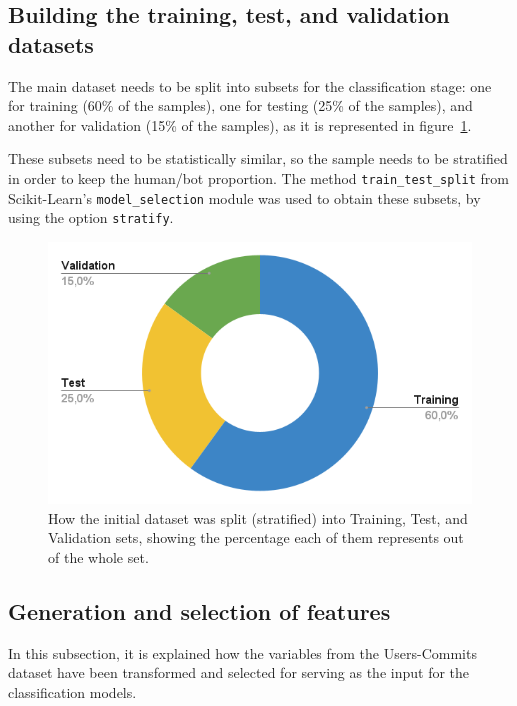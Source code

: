 \documentclass[a4paper, 12pt]{book}
\begin{document}
\subsection{Building the training, test, and validation datasets}
\label{ssec:build-training-datasets}

The main dataset needs to be split into subsets for the classification stage: one for training (60\% of the samples), one for testing (25\% of the samples), and another for validation (15\% of the samples), as it is represented in figure~\ref{fig:dataset-percentages}. 

These subsets need to be statistically similar, so the sample needs to be stratified in order to keep the human/bot proportion. The method \texttt{train\_test\_split} from Scikit-Learn's \texttt{model\_selection} module was used to obtain these subsets, by using the option \texttt{stratify}.

\begin{figure}
 \centering
  \includegraphics[width=12cm, keepaspectratio]{img/dataset-percentages.png}
  \caption{How the initial dataset was split (stratified) into Training, Test, and Validation sets, showing the percentage each of them represents out of the whole set.}
  \label{fig:dataset-percentages}
\end{figure}

\subsection{Generation and selection of features}
\label{ssec:selection-features}

In this subsection, it is explained how the variables from the Users-Commits dataset have been transformed and selected for serving as the input for the classification models.
\end{document}
